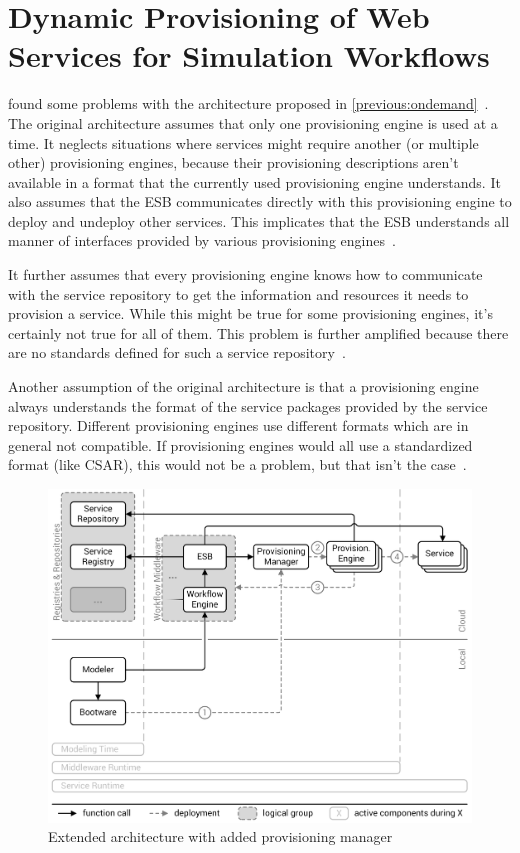 \section{Dynamic Provisioning of Web Services for Simulation Workflows}
\label{previous:dynamic}

\citeauthor{provisioning:dynamic} found some problems with the architecture proposed in \autoref{previous:ondemand}~\autocite{provisioning:dynamic}.
The original architecture assumes that only one provisioning engine is used at a time.
It neglects situations where services might require another (or multiple other) provisioning engines, because their provisioning descriptions aren't available in a format that the currently used provisioning engine understands.
It also assumes that the ESB communicates directly with this provisioning engine to deploy and undeploy other services.
This implicates that the ESB understands all manner of interfaces provided by various provisioning engines~\autocite{provisioning:dynamic}.

It further assumes that every provisioning engine knows how to communicate with the service repository to get the information and resources it needs to provision a service.
While this might be true for some provisioning engines, it's certainly not true for all of them.
This problem is further amplified because there are no standards defined for such a service repository~\autocite{provisioning:dynamic}.

Another assumption of the original architecture is that a provisioning engine always understands the format of the service packages provided by the service repository.
Different provisioning engines use different formats which are in general not compatible.
If provisioning engines would all use a standardized format (like CSAR), this would not be a problem, but that isn't the case~\autocite{provisioning:dynamic}.

\begin{figure}[!htbp]
	\centering
	\includegraphics[resolution=600]{previous/assets/valeri_architecture}
	\caption{Extended architecture with added provisioning manager~\autocite[based on][]{provisioning:dynamic}}
	\label{image:valeri_architecture}
\end{figure}

